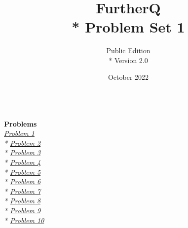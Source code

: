 
\title{FurtherQ \\* Problem Set 1}
\author{Public Edition \\* Version 2.0}
\date{October 2022}




\maketitle

\textbf{\\\Large{Problems}}\\
\textit{
  \large
  \hyperlink{P1}{Problem 1} \\*
  \hyperlink{P2}{Problem 2} \\*
  \hyperlink{P3}{Problem 3} \\*
  \hyperlink{P4}{Problem 4} \\*
  \hyperlink{P5}{Problem 5} \\*
  \hyperlink{P6}{Problem 6} \\*
  \hyperlink{P7}{Problem 7} \\*
  \hyperlink{P8}{Problem 8} \\*
  \hyperlink{P9}{Problem 9} \\*
  \hyperlink{P10}{Problem 10} \\
}

